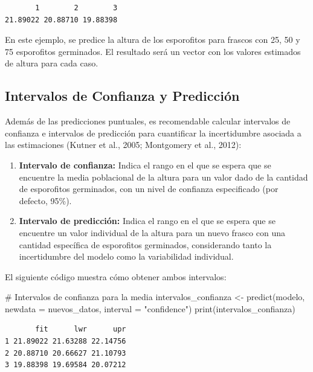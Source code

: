 \documentclass[
  spanish,
  a4paper,
  DIV=11,
  numbers=noendperiod,
  onepage,
  openany]{scrreprt}
\newenvironment{Shaded}{\begin{snugshade}}{\end{snugshade}}
\newcommand{\AttributeTok}[1]{\textcolor[rgb]{0.40,0.45,0.13}{#1}}
\newcommand{\CommentTok}[1]{\textcolor[rgb]{0.37,0.37,0.37}{#1}}
\newcommand{\FunctionTok}[1]{\textcolor[rgb]{0.28,0.35,0.67}{#1}}
\newcommand{\NormalTok}[1]{\textcolor[rgb]{0.00,0.23,0.31}{#1}}
\newcommand{\OtherTok}[1]{\textcolor[rgb]{0.00,0.23,0.31}{#1}}
\newcommand{\StringTok}[1]{\textcolor[rgb]{0.13,0.47,0.30}{#1}}
\begin{document}
\begin{verbatim}
       1        2        3 
21.89022 20.88710 19.88398 
\end{verbatim}

En este ejemplo, se predice la altura de los esporofitos para frascos
con 25, 50 y 75 esporofitos germinados. El resultado será un vector con
los valores estimados de altura para cada caso.

\subsection{Intervalos de Confianza y
Predicción}\label{intervalos-de-confianza-y-predicciuxf3n}

Además de las predicciones puntuales, es recomendable calcular
intervalos de confianza e intervalos de predicción para cuantificar la
incertidumbre asociada a las estimaciones (Kutner et al., 2005;
Montgomery et al., 2012):

\begin{enumerate}
\def\labelenumi{\arabic{enumi}.}
\item
  \textbf{Intervalo de confianza:} Indica el rango en el que se espera
  que se encuentre la media poblacional de la altura para un valor dado
  de la cantidad de esporofitos germinados, con un nivel de confianza
  especificado (por defecto, 95\%).
\item
  \textbf{Intervalo de predicción:} Indica el rango en el que se espera
  que se encuentre un valor individual de la altura para un nuevo frasco
  con una cantidad específica de esporofitos germinados, considerando
  tanto la incertidumbre del modelo como la variabilidad individual.
\end{enumerate}

El siguiente código muestra cómo obtener ambos intervalos:

\begin{Shaded}
\begin{Highlighting}[]
\CommentTok{\# Intervalos de confianza para la media}
\NormalTok{intervalos\_confianza }\OtherTok{\textless{}{-}} \FunctionTok{predict}\NormalTok{(modelo, }
                                \AttributeTok{newdata =}\NormalTok{ nuevos\_datos, }
                                \AttributeTok{interval =} \StringTok{"confidence"}\NormalTok{)}
\FunctionTok{print}\NormalTok{(intervalos\_confianza)}
\end{Highlighting}
\end{Shaded}

\begin{verbatim}
       fit      lwr      upr
1 21.89022 21.63288 22.14756
2 20.88710 20.66627 21.10793
3 19.88398 19.69584 20.07212
\end{verbatim}
\end{document}
